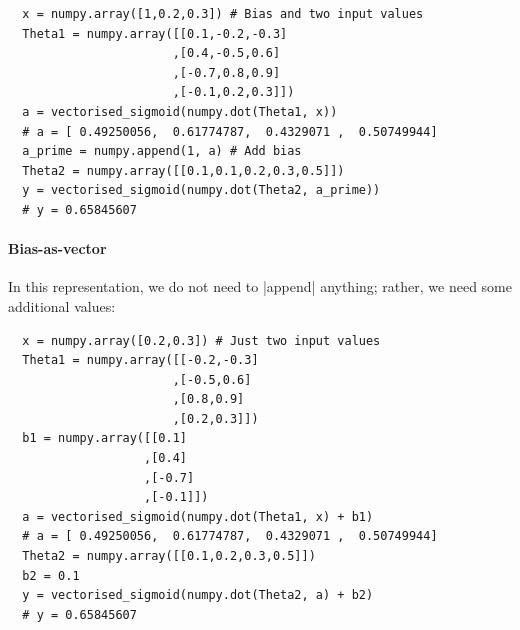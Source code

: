 \begin{lstlisting}
  x = numpy.array([1,0.2,0.3]) # Bias and two input values
  Theta1 = numpy.array([[0.1,-0.2,-0.3]
                       ,[0.4,-0.5,0.6]
                       ,[-0.7,0.8,0.9]
                       ,[-0.1,0.2,0.3]])
  a = vectorised_sigmoid(numpy.dot(Theta1, x))
  # a = [ 0.49250056,  0.61774787,  0.4329071 ,  0.50749944]
  a_prime = numpy.append(1, a) # Add bias
  Theta2 = numpy.array([[0.1,0.1,0.2,0.3,0.5]])
  y = vectorised_sigmoid(numpy.dot(Theta2, a_prime))
  # y = 0.65845607
\end{lstlisting}
\paragraph{Bias-as-vector}
In this representation, we do not need to \py|append| anything; rather, we need some additional values:
\begin{lstlisting}
  x = numpy.array([0.2,0.3]) # Just two input values
  Theta1 = numpy.array([[-0.2,-0.3]
                       ,[-0.5,0.6]
                       ,[0.8,0.9]
                       ,[0.2,0.3]])
  b1 = numpy.array([[0.1]
                   ,[0.4]
                   ,[-0.7]
                   ,[-0.1]])
  a = vectorised_sigmoid(numpy.dot(Theta1, x) + b1)
  # a = [ 0.49250056,  0.61774787,  0.4329071 ,  0.50749944]
  Theta2 = numpy.array([[0.1,0.2,0.3,0.5]])
  b2 = 0.1
  y = vectorised_sigmoid(numpy.dot(Theta2, a) + b2)
  # y = 0.65845607
\end{lstlisting}

